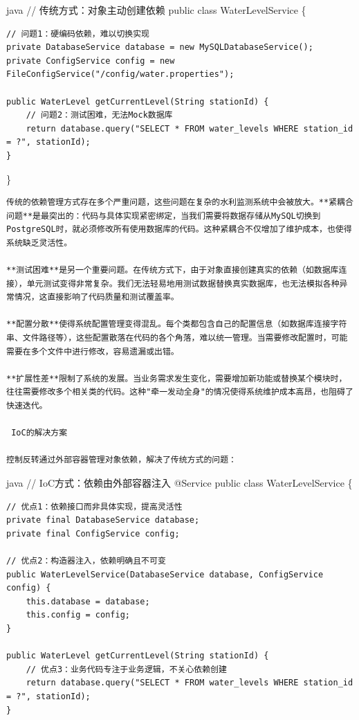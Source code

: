 java // 传统方式：对象主动创建依赖 public class WaterLevelService \{

\begin{verbatim}
// 问题1：硬编码依赖，难以切换实现
private DatabaseService database = new MySQLDatabaseService();
private ConfigService config = new FileConfigService("/config/water.properties");

public WaterLevel getCurrentLevel(String stationId) {
    // 问题2：测试困难，无法Mock数据库
    return database.query("SELECT * FROM water_levels WHERE station_id = ?", stationId);
}
\end{verbatim}

\}

\begin{lstlisting}
传统的依赖管理方式存在多个严重问题，这些问题在复杂的水利监测系统中会被放大。**紧耦合问题**是最突出的：代码与具体实现紧密绑定，当我们需要将数据存储从MySQL切换到PostgreSQL时，就必须修改所有使用数据库的代码。这种紧耦合不仅增加了维护成本，也使得系统缺乏灵活性。

**测试困难**是另一个重要问题。在传统方式下，由于对象直接创建真实的依赖（如数据库连接），单元测试变得非常复杂。我们无法轻易地用测试数据替换真实数据库，也无法模拟各种异常情况，这直接影响了代码质量和测试覆盖率。

**配置分散**使得系统配置管理变得混乱。每个类都包含自己的配置信息（如数据库连接字符串、文件路径等），这些配置散落在代码的各个角落，难以统一管理。当需要修改配置时，可能需要在多个文件中进行修改，容易遗漏或出错。

**扩展性差**限制了系统的发展。当业务需求发生变化，需要增加新功能或替换某个模块时，往往需要修改多个相关类的代码。这种"牵一发动全身"的情况使得系统维护成本高昂，也阻碍了快速迭代。

 IoC的解决方案

控制反转通过外部容器管理对象依赖，解决了传统方式的问题：
\end{lstlisting}

java // IoC方式：依赖由外部容器注入 @Service public class WaterLevelService \{

\begin{verbatim}
// 优点1：依赖接口而非具体实现，提高灵活性
private final DatabaseService database;
private final ConfigService config;

// 优点2：构造器注入，依赖明确且不可变
public WaterLevelService(DatabaseService database, ConfigService config) {
    this.database = database;
    this.config = config;
}

public WaterLevel getCurrentLevel(String stationId) {
    // 优点3：业务代码专注于业务逻辑，不关心依赖创建
    return database.query("SELECT * FROM water_levels WHERE station_id = ?", stationId);
}
\end{verbatim}

